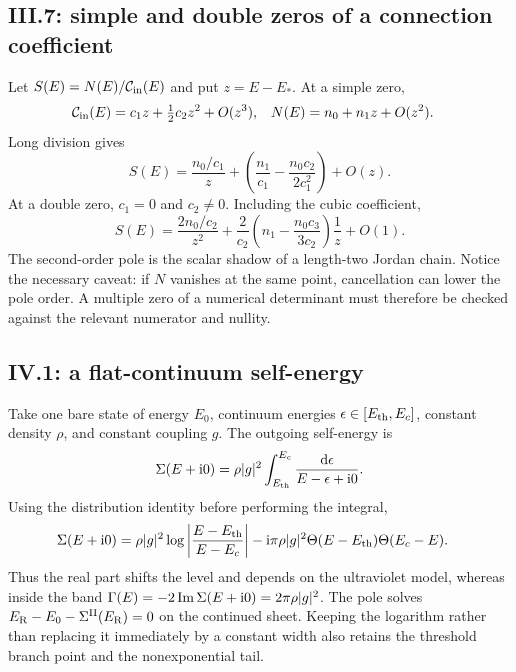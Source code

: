 \subsection*{III.7: simple and double zeros of a connection coefficient}

Let $S(E)=N(E)/\mathcal{C}_{\mathrm{in}}(E)$ and put $z=E-E_*$.  At a simple zero,
\begin{align}
  \mathcal{C}_{\mathrm{in}}(E)&=c_1z+\tfrac12c_2z^2+O(z^3),
  &N(E)&=n_0+n_1z+O(z^2).
\end{align}
Long division gives
\begin{equation}
  S(E)=\frac{n_0/c_1}{z}
  +\left(\frac{n_1}{c_1}-\frac{n_0c_2}{2c_1^2}\right)+O(z).
\end{equation}
At a double zero, $c_1=0$ and $c_2\ne0$.  Including the cubic coefficient,
\begin{equation}
  S(E)=\frac{2n_0/c_2}{z^2}
  +\frac{2}{c_2}
   \left(n_1-\frac{n_0c_3}{3c_2}\right)\frac{1}{z}+O(1).
\end{equation}
The second-order pole is the scalar shadow of a length-two Jordan chain.
Notice the necessary caveat: if $N$ vanishes at the same point, cancellation
can lower the pole order.  A multiple zero of a numerical determinant must
therefore be checked against the relevant numerator and nullity.

\subsection*{IV.1: a flat-continuum self-energy}

Take one bare state of energy $E_0$, continuum energies
$\epsilon\in[E_{\mathrm{th}},E_c]$, constant density $\rho$, and constant coupling
$g$.  The outgoing self-energy is
\begin{equation}
  \Sigma(E+\mathrm{i}0)=\rho|g|^2
  \int_{E_{\mathrm{th}}}^{E_c}
  \frac{\mathrm{d}\epsilon}{E-\epsilon+\mathrm{i}0}.
\end{equation}
Using the distribution identity before performing the integral,
\begin{align}
  \Sigma(E+\mathrm{i}0)
  &=\rho|g|^2
  \log\left|\frac{E-E_{\mathrm{th}}}{E-E_c}\right|
  -\mathrm{i}\pi\rho|g|^2
  \Theta(E-E_{\mathrm{th}})\Theta(E_c-E).
\end{align}
Thus the real part shifts the level and depends on the ultraviolet model,
whereas inside the band
$\Gamma(E)=-2\operatorname{Im}\Sigma(E+\mathrm{i}0)=2\pi\rho|g|^2$.
The pole solves $E_{\mathrm{R}}-E_0-\Sigma^{\mathrm{II}}(E_{\mathrm{R}})=0$ on the continued sheet.
Keeping the logarithm rather than replacing it immediately by a constant
width also retains the threshold branch point and the nonexponential tail.

